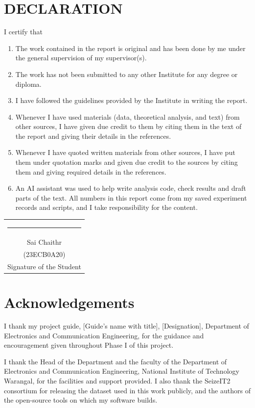 \documentclass[12pt,a4paper,oneside]{report}
\newcommand{\studentA}{Sai Chaithr}
\newcommand{\rollA}{23ECB0A20}
\newcommand{\guide}{[Guide's name with title]}
\newcommand{\guidedesig}{[Designation]}
\newcommand{\dept}{Electronics and Communication Engineering}
\begin{document}
\chapter*{\centering\large\bfseries DECLARATION}
\thispagestyle{plain}
I certify that
\begin{enumerate}[label=\alph*.]
\item The work contained in the report is original and has been done by me under the general supervision of my
  supervisor(s).
\item The work has not been submitted to any other Institute for any degree or diploma.
\item I have followed the guidelines provided by the Institute in writing the report.
\item Whenever I have used materials (data, theoretical analysis, and text) from other sources, I have given due
  credit to them by citing them in the text of the report and giving their details in the references.
\item Whenever I have quoted written materials from other sources, I have put them under quotation marks and given
  due credit to the sources by citing them and giving required details in the references.
\item An AI assistant was used to help write analysis code, check results and draft parts of the text. All numbers
  in this report come from my saved experiment records and scripts, and I take responsibility for the content.
\end{enumerate}

\vspace{30mm}
\noindent
\hfill\begin{tabular}{@{}c@{}}
\rule{50mm}{0.4pt}\\
\studentA\\
(\rollA)\\
Signature of the Student
\end{tabular}

\chapter*{Acknowledgements}
\thispagestyle{plain}
I thank my project guide, \guide, \guidedesig, Department of \dept, for the guidance and encouragement given
throughout Phase I of this project.

I thank the Head of the Department and the faculty of the Department of \dept, National Institute of Technology
Warangal, for the facilities and support provided. I also thank the SeizeIT2 consortium for releasing the dataset
used in this work publicly, and the authors of the open-source tools on which my software builds.
\end{document}

